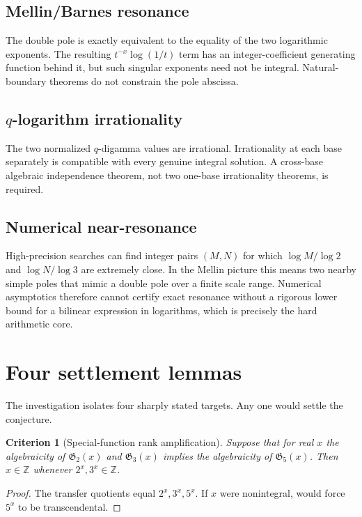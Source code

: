 \documentclass[11pt]{article}
\numberwithin{equation}{section}
\newtheorem{criterion}[theorem]{Criterion}
\theoremstyle{definition}
\theoremstyle{remark}
\newcommand{\Z}{\mathbb{Z}}
\begin{document}
\subsection{Mellin/Barnes resonance}
The double pole is exactly equivalent to the equality of the two logarithmic exponents.  The resulting $t^{-x}\log(1/t)$ term has an integer-coefficient generating function behind it, but such singular exponents need not be integral.  Natural-boundary theorems do not constrain the pole abscissa.

\subsection{$q$-logarithm irrationality}
The two normalized $q$-digamma values are irrational.  Irrationality at each base separately is compatible with every genuine integral solution.  A cross-base algebraic independence theorem, not two one-base irrationality theorems, is required.

\subsection{Numerical near-resonance}
High-precision searches can find integer pairs $(M,N)$ for which $\log M/\log2$ and $\log N/\log3$ are extremely close.  In the Mellin picture this means two nearby simple poles that mimic a double pole over a finite scale range.  Numerical asymptotics therefore cannot certify exact resonance without a rigorous lower bound for a bilinear expression in logarithms, which is precisely the hard arithmetic core.

\section{Four settlement lemmas}
\label{sec:settlement}

The investigation isolates four sharply stated targets.  Any one would settle the conjecture.

\begin{criterion}[Special-function rank amplification]
Suppose that for real $x$ the algebraicity of $\mathfrak G_2(x)$ and $\mathfrak G_3(x)$ implies the algebraicity of $\mathfrak G_5(x)$.  Then $x\in\Z$ whenever $2^x,3^x\in\Z$.
\end{criterion}

\begin{proof}
The transfer quotients equal $2^x,3^x,5^x$.  If $x$ were nonintegral,  would force $5^x$ to be transcendental.
\end{proof}
\end{document}

